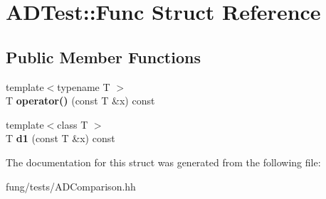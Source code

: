 \hypertarget{structADTest_1_1Func}{\section{A\-D\-Test\-:\-:Func Struct Reference}
\label{structADTest_1_1Func}
}
\subsection*{Public Member Functions}
\begin{DoxyCompactItemize}
\item 
\hypertarget{structADTest_1_1Func_ae71a77a831a3a9d337358fcf2ebb9e18}{{\footnotesize template$<$typename T $>$ }\\T {\bfseries operator()} (const T \&x) const }\label{structADTest_1_1Func_ae71a77a831a3a9d337358fcf2ebb9e18}

\item 
\hypertarget{structADTest_1_1Func_ab8deaf10c85fdddd7256696fbbf431ea}{{\footnotesize template$<$class T $>$ }\\T {\bfseries d1} (const T \&x) const }\label{structADTest_1_1Func_ab8deaf10c85fdddd7256696fbbf431ea}

\end{DoxyCompactItemize}


The documentation for this struct was generated from the following file\-:\begin{DoxyCompactItemize}
\item 
fung/tests/A\-D\-Comparison.\-hh\end{DoxyCompactItemize}

